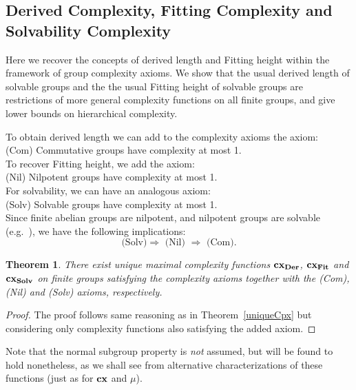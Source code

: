 \documentclass[a4paper,11pt]{amsart}
\newtheorem{theorem}{Theorem}[section]
\theoremstyle{definition}
\newcommand{\cx}{\mbox{\bf cx}}
\newcommand{\Fit}{{\bf Fit}}
\newcommand{\Der}{{\bf Der}}
\newcommand{\Solv}{{\bf Solv}}
\newcommand{\1}{{\mathbf 1}}
\begin{document}
\subsection{Derived Complexity, Fitting Complexity and Solvability Complexity}\label{der-fit-solv-cpx}


Here we recover the concepts of derived length and Fitting height within the framework of group complexity axioms.
We show that the usual derived length of solvable groups and the the usual Fitting height of solvable groups are restrictions of more general complexity functions on all finite groups, and give lower bounds on hierarchical complexity. 

\noindent To obtain derived length we can add to the complexity axioms the axiom:\\

(Com) Commutative groups have complexity at most 1.\\

\noindent To recover Fitting height,
we add the axiom:\\

(Nil) Nilpotent groups have complexity at most 1.\\

\noindent For solvability, we can have an analogous axiom:\\

(Solv) Solvable groups have complexity at most 1.\\ 

Since finite abelian groups are nilpotent, and nilpotent groups are
solvable (e.g.\ \cite[Ch.~9 \& 10]{Hall}), we have the following implications: \\
$$\mbox{(Solv)} \Rightarrow \mbox{ (Nil) }\Rightarrow \mbox{ (Com)}.$$


\begin{theorem}\label{variantMaxCpxFunctions}
There exist  unique maximal complexity functions $\cx_\Der$, $\cx_\Fit$ and $\cx_\Solv$  on finite groups satisfying the complexity axioms together with the {\rm (Com)}, {\rm (Nil)} and {\rm (Solv)} axioms, respectively. 
\end{theorem}
\begin{proof}
The proof follows same reasoning as in Theorem~\ref{uniqueCpx} but considering only complexity functions also satisfying the added axiom.
\end{proof}


Note that the normal subgroup property is {\em not }assumed, but will be found to hold nonetheless, as we shall see from alternative characterizations of these functions (just as for $\cx$ and $\mu$).  
\end{document}
